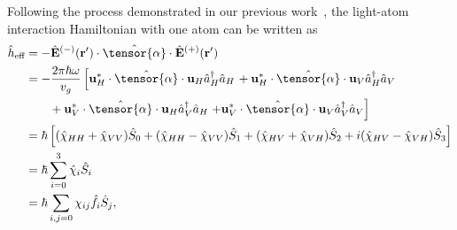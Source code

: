 \documentclass[preprint,aps,pra,onecolumn,superscriptaddress]{revtex4-1} %
\def\br{\mathbf{r}}
\newcommand{\nn}{\nonumber}
\newcommand{\eff}{\text{eff}}
\begin{document}
Following the process demonstrated in our previous work~\cite{Qi2016}, the light-atom interaction Hamiltonian with one atom can be written as
\begin{align}
\hat{h}_\eff &= -\hat{\mathbf{E}}^{(-)}(\br')\cdot\hat{\tensor{\mathbf{\alpha}}}\cdot\hat{\mathbf{E}}^{(+)}(\br')\nn\\
&= -\frac{2\pi\hbar\omega}{v_g}\left[\mathbf{u}_H^*\cdot\hat{\tensor{\mathbf{\alpha}}}\cdot \mathbf{u}_H\hat{a}_H^\dagger\hat{a}_H\right.
+ \mathbf{u}_H^*\cdot\hat{\tensor{\mathbf{\alpha}}}\cdot \mathbf{u}_V\hat{a}_H^\dagger\hat{a}_V\nn\\
&\quad\quad + \mathbf{u}_V^*\cdot\hat{\tensor{\mathbf{\alpha}}}\cdot \mathbf{u}_H\hat{a}_V^\dagger\hat{a}_H 
\left. + \mathbf{u}_V^*\cdot\hat{\tensor{\mathbf{\alpha}}}\cdot \mathbf{u}_V\hat{a}_V^\dagger\hat{a}_V\right]\\
&= \hbar\left[(\hat{\chi}_{HH}+\hat{\chi}_{VV})\hat{S}_0 + (\hat{\chi}_{HH}-\hat{\chi}_{VV})\hat{S}_1 + (\hat{\chi}_{HV}+\hat{\chi}_{VH})\hat{S}_2 + i(\hat{\chi}_{HV}-\hat{\chi}_{VH})\hat{S}_3 \right]\\
&=\hbar\sum_{i=0}^3 \hat{\chi}_{i}\hat{S}_i\\
&=\hbar\sum_{i,j=0} \chi_{ij}\hat{f}_i\hat{S}_j,
\end{align}
\end{document}

